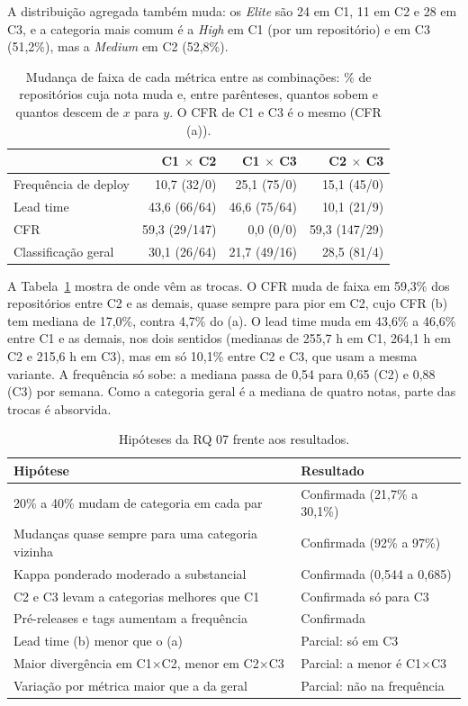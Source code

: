 A distribuição agregada também muda: os \textit{Elite} são 24 em C1, 11 em C2 e 28 em C3, e a categoria mais comum é a \textit{High} em C1 (por um repositório) e em C3 (51,2\%), mas a \textit{Medium} em C2 (52,8\%).

\begin{table}[ht]
\centering
\footnotesize
\caption{Mudança de faixa de cada métrica entre as combinações: \% de repositórios cuja nota muda e, entre parênteses, quantos sobem e quantos descem de $x$ para $y$. O CFR de C1 e C3 é o mesmo (CFR (a)).}
\label{tab:rq07_metricas}
\begin{tabular}{lrrr}
\hline
 & C1 $\times$ C2 & C1 $\times$ C3 & C2 $\times$ C3 \\
\hline
Frequência de deploy & 10,7 (32/0) & 25,1 (75/0) & 15,1 (45/0) \\
Lead time & 43,6 (66/64) & 46,6 (75/64) & 10,1 (21/9) \\
CFR & 59,3 (29/147) & 0,0 (0/0) & 59,3 (147/29) \\
Classificação geral & 30,1 (26/64) & 21,7 (49/16) & 28,5 (81/4) \\
\hline
\end{tabular}
\end{table}

A Tabela~\ref{tab:rq07_metricas} mostra de onde vêm as trocas. O CFR muda de faixa em 59,3\% dos repositórios entre C2 e as demais, quase sempre para pior em C2, cujo CFR (b) tem mediana de 17,0\%, contra 4,7\% do (a). O lead time muda em 43,6\% a 46,6\% entre C1 e as demais, nos dois sentidos (medianas de 255,7 h em C1, 264,1 h em C2 e 215,6 h em C3), mas em só 10,1\% entre C2 e C3, que usam a mesma variante. A frequência só sobe: a mediana passa de 0,54 para 0,65 (C2) e 0,88 (C3) por semana. Como a categoria geral é a mediana de quatro notas, parte das trocas é absorvida.

\begin{table}[t]
\centering
\footnotesize
\caption{Hipóteses da RQ 07 frente aos resultados.}
\label{tab:hipoteses_rq07}
\begin{tabular}{p{}p{}}
\hline
Hipótese & Resultado \\
\hline
20\% a 40\% mudam de categoria em cada par & Confirmada (21,7\% a 30,1\%) \\
Mudanças quase sempre para uma categoria vizinha & Confirmada (92\% a 97\%) \\
Kappa ponderado moderado a substancial & Confirmada (0,544 a 0,685) \\
C2 e C3 levam a categorias melhores que C1 & Confirmada só para C3 \\
Pré-releases e tags aumentam a frequência & Confirmada \\
Lead time (b) menor que o (a) & Parcial: só em C3 \\
Maior divergência em C1$\times$C2, menor em C2$\times$C3 & Parcial: a menor é C1$\times$C3 \\
Variação por métrica maior que a da geral & Parcial: não na frequência \\
\hline
\end{tabular}
\end{table}

